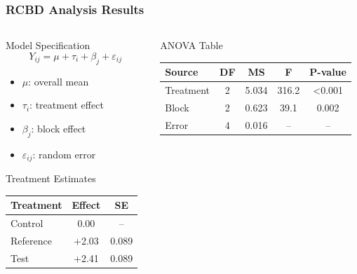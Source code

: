 \documentclass[aspectratio=43]{beamer}
\begin{document}
\begin{frame}
    \frametitle{RCBD Analysis Results}
    
    \begin{columns}[T]
        \begin{column}{0.5\textwidth}
            \begin{block}{Model Specification}
                $$Y_{ij} = \mu + \tau_i + \beta_j + \varepsilon_{ij}$$
                \begin{itemize}
                    \item $\mu$: overall mean
                    \item $\tau_i$: treatment effect
                    \item $\beta_j$: block effect
                    \item $\varepsilon_{ij}$: random error
                \end{itemize}
            \end{block}
            
            \begin{block}{Treatment Estimates}
                \scriptsize
                \begin{tabular}{lcc}
                    \hline
                    Treatment & Effect & SE \\
                    \hline
                    Control & 0.00 & -- \\
                    Reference & +2.03 & 0.089 \\
                    Test & +2.41 & 0.089 \\
                    \hline
                \end{tabular}
            \end{block}
        \end{column}
        
        \begin{column}{0.5\textwidth}
            \begin{block}{ANOVA Table}
                \scriptsize
                \begin{tabular}{lcccc}
                    \hline
                    Source & DF & MS & F & P-value \\
                    \hline
                    Treatment & 2 & 5.034 & 316.2 & <0.001 \\
                    Block & 2 & 0.623 & 39.1 & 0.002 \\
                    Error & 4 & 0.016 & -- & -- \\
                    \hline
                \end{tabular}
            \end{block}
            

\end{column}
\end{columns}
\end{frame}
\end{document}
